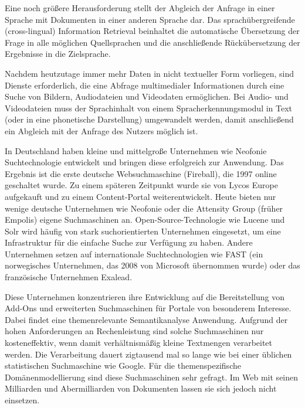\documentclass[]{../../metanetpaper}
\begin{document}
\begin{Parallel}[c]{80mm}{80mm}
{Eine noch größere Herausforderung stellt der Abgleich der Anfrage in einer Sprache mit Dokumenten in einer anderen Sprache dar. Das sprachübergreifende (cross-lingual) Information Retrieval beinhaltet die automatische Übersetzung der Frage in alle möglichen Quellsprachen und die anschließende Rückübersetzung der Ergebnisse in die Zielsprache. 

Nachdem heutzutage immer mehr Daten in nicht textueller Form vorliegen, sind Dienste erforderlich, die eine Abfrage multimedialer Informationen durch eine Suche von Bildern, Audiodateien und Videodaten ermöglichen. Bei Audio- und Videodateien muss der Sprachinhalt von einem Spracherkennungsmodul in Text (oder in eine phonetische Darstellung) umgewandelt werden, damit anschließend ein Abgleich mit der Anfrage des Nutzers möglich ist.

In Deutschland haben kleine und mittelgroße Unternehmen wie Neofonie Suchtechnologie entwickelt und bringen diese erfolgreich zur Anwendung. Das Ergebnis ist die erste deutsche Websuchmaschine (Fireball), die 1997 online geschaltet wurde. Zu einem späteren Zeitpunkt wurde sie von Lycos Europe aufgekauft und zu einem Content-Portal weiterentwickelt. Heute bieten nur wenige deutsche Unternehmen wie Neofonie oder die Attensity Group (früher Empolis) eigene Suchmaschinen an. Open-Source-Technologie wie Lucene und Solr wird häufig von stark suchorientierten Unternehmen eingesetzt, um eine Infrastruktur für die einfache Suche zur Verfügung zu haben. Andere Unternehmen setzen auf internationale Suchtechnologien wie FAST (ein norwegisches Unternehmen, das 2008 von Microsoft übernommen wurde) oder das französische Unternehmen Exalead.

Diese Unternehmen konzentrieren ihre Entwicklung auf die Bereitstellung von Add-Ons und erweiterten Suchmaschinen für Portale von besonderem Interesse. Dabei findet eine themenrelevante Semantikanalyse Anwendung. Aufgrund der hohen Anforderungen an Rechenleistung sind solche Suchmaschinen nur kosteneffektiv, wenn damit verhältnismäßig kleine Textmengen verarbeitet werden. Die Verarbeitung dauert zigtausend mal so lange wie bei einer üblichen statistischen Suchmaschine wie Google. Für die themenspezifische Domänenmodellierung sind diese Suchmaschinen sehr gefragt. Im Web mit seinen Milliarden und Abermilliarden von Dokumenten lassen sie sich jedoch nicht einsetzen.

}
\end{Parallel}
\end{document}
